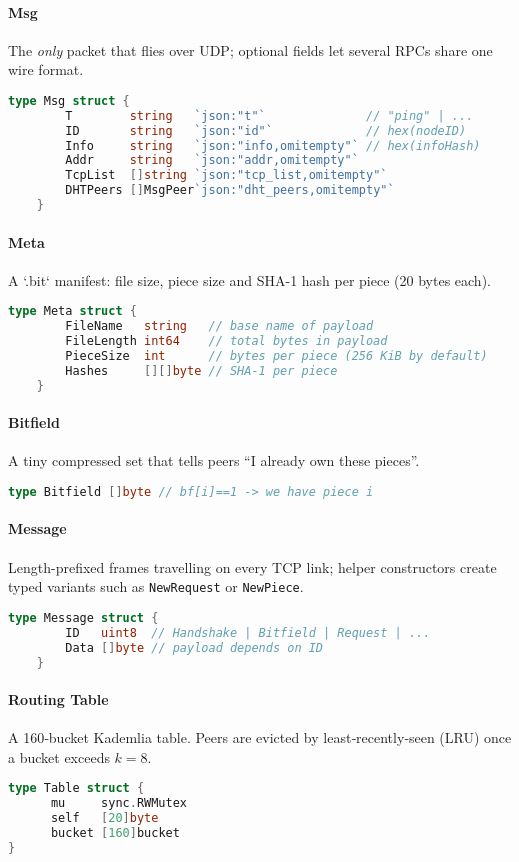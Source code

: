 \documentclass[11pt,a4paper]{article}
\begin{document}
\paragraph{Msg} The \emph{only} packet that flies over UDP; optional fields let several RPCs share one wire format.
\begin{lstlisting}[language=go]
	type Msg struct {
		T        string   `json:"t"`              // "ping" | ...
		ID       string   `json:"id"`             // hex(nodeID)
		Info     string   `json:"info,omitempty"` // hex(infoHash)
		Addr     string   `json:"addr,omitempty"`
		TcpList  []string `json:"tcp_list,omitempty"`
		DHTPeers []MsgPeer`json:"dht_peers,omitempty"`
	}
\end{lstlisting}

\paragraph{Meta} A `.bit` manifest: file size, piece size and SHA-1 hash per piece (20 bytes each).
\begin{lstlisting}[language=go]
	type Meta struct {
		FileName   string   // base name of payload
		FileLength int64    // total bytes in payload
		PieceSize  int      // bytes per piece (256 KiB by default)
		Hashes     [][]byte // SHA-1 per piece
	}
\end{lstlisting}

\paragraph{Bitfield} A tiny compressed set that tells peers “I already own these pieces”.
\begin{lstlisting}[language=go]
	type Bitfield []byte // bf[i]==1 -> we have piece i
\end{lstlisting}

\paragraph{Message} Length-prefixed frames travelling on every TCP link; helper constructors create typed variants such as \texttt{NewRequest} or \texttt{NewPiece}.
\begin{lstlisting}[language=go]
	type Message struct {
		ID   uint8  // Handshake | Bitfield | Request | ...
		Data []byte // payload depends on ID
	}
\end{lstlisting}


\paragraph{Routing Table} A 160‑bucket Kademlia table.
Peers are evicted by least‑recently‑seen (LRU) once a bucket exceeds \(k=8\).
\begin{lstlisting}[language=go]
  type Table struct {
	  mu     sync.RWMutex
	  self   [20]byte
	  bucket [160]bucket
}
  
\end{lstlisting}
\end{document}
